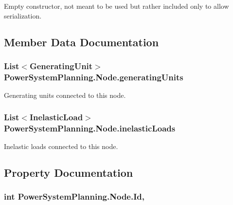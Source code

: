 Empty constructor, not meant to be used but rather included only to allow serialization. 



\subsection{Member Data Documentation}
\subsubsection[{\texorpdfstring{generating\+Units}{generatingUnits}}]{\setlength{\rightskip}{0pt plus 5cm}List$<${\bf Generating\+Unit}$>$ Power\+System\+Planning.\+Node.\+generating\+Units}\hypertarget{class_power_system_planning_1_1_node_a8b0943967935c496d57afbd76b12706c}{}\label{class_power_system_planning_1_1_node_a8b0943967935c496d57afbd76b12706c}


Generating units connected to this node. 

\subsubsection[{\texorpdfstring{inelastic\+Loads}{inelasticLoads}}]{\setlength{\rightskip}{0pt plus 5cm}List$<${\bf Inelastic\+Load}$>$ Power\+System\+Planning.\+Node.\+inelastic\+Loads}\hypertarget{class_power_system_planning_1_1_node_a4cc33a77151060a8eb42d879017733da}{}\label{class_power_system_planning_1_1_node_a4cc33a77151060a8eb42d879017733da}


Inelastic loads connected to this node. 



\subsection{Property Documentation}
\subsubsection[{\texorpdfstring{Id}{Id}}]{\setlength{\rightskip}{0pt plus 5cm}int Power\+System\+Planning.\+Node.\+Id\hspace{0.3cm}{\ttfamily [get]}, {\ttfamily [set]}}\hypertarget{class_power_system_planning_1_1_node_abd72649e4b2b83daa0980ab87a90034a}{}\label{class_power_system_planning_1_1_node_abd72649e4b2b83daa0980ab87a90034a}


